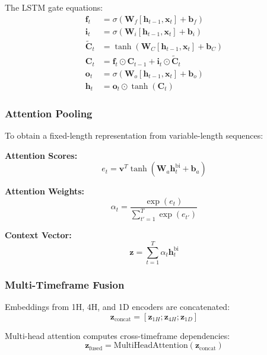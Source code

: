 \documentclass[conference]{IEEEtran}
\begin{document}
The LSTM gate equations:
\begin{equation}
\begin{aligned}
\mathbf{f}_t &= \sigma(\mathbf{W}_f[\mathbf{h}_{t-1}, \mathbf{x}_t] + \mathbf{b}_f) \\
\mathbf{i}_t &= \sigma(\mathbf{W}_i[\mathbf{h}_{t-1}, \mathbf{x}_t] + \mathbf{b}_i) \\
\tilde{\mathbf{C}}_t &= \tanh(\mathbf{W}_C[\mathbf{h}_{t-1}, \mathbf{x}_t] + \mathbf{b}_C) \\
\mathbf{C}_t &= \mathbf{f}_t \odot \mathbf{C}_{t-1} + \mathbf{i}_t \odot \tilde{\mathbf{C}}_t \\
\mathbf{o}_t &= \sigma(\mathbf{W}_o[\mathbf{h}_{t-1}, \mathbf{x}_t] + \mathbf{b}_o) \\
\mathbf{h}_t &= \mathbf{o}_t \odot \tanh(\mathbf{C}_t)
\end{aligned}
\end{equation}

\subsubsection{Attention Pooling}
To obtain a fixed-length representation from variable-length sequences:

\textbf{Attention Scores:}
\begin{equation}
e_t = \mathbf{v}^T\tanh(\mathbf{W}_a\mathbf{h}_t^{\text{bi}} + \mathbf{b}_a)
\end{equation}

\textbf{Attention Weights:}
\begin{equation}
\alpha_t = \frac{\exp(e_t)}{\sum_{t'=1}^{T}\exp(e_{t'})}
\end{equation}

\textbf{Context Vector:}
\begin{equation}
\mathbf{z} = \sum_{t=1}^{T}\alpha_t\mathbf{h}_t^{\text{bi}}
\end{equation}

\subsubsection{Multi-Timeframe Fusion}
Embeddings from 1H, 4H, and 1D encoders are concatenated:
\begin{equation}
\mathbf{z}_{\text{concat}} = [\mathbf{z}_{1H}; \mathbf{z}_{4H}; \mathbf{z}_{1D}]
\end{equation}

Multi-head attention computes cross-timeframe dependencies:
\begin{equation}
\mathbf{z}_{\text{fused}} = \text{MultiHeadAttention}(\mathbf{z}_{\text{concat}})
\end{equation}
\end{document}
